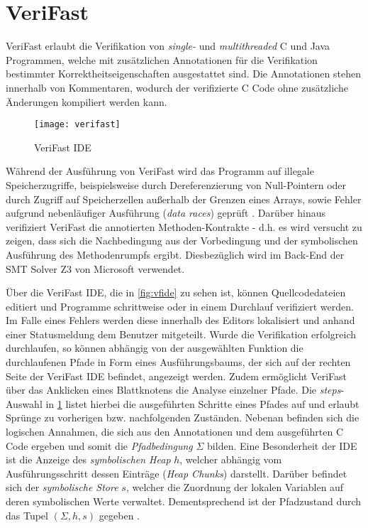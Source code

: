 \section{VeriFast}

VeriFast erlaubt die Verifikation von \emph{single-} und \emph{multithreaded} C und Java Programmen, welche mit zusätzlichen Annotationen für die Verifikation bestimmter Korrektheitseigenschaften ausgestattet sind. Die Annotationen stehen innerhalb von Kommentaren, wodurch der verifizierte C Code ohne zusätzliche Änderungen kompiliert werden kann.

\begin{figure}[t]
	\centering
	\texttt{[image: verifast]}
	\caption{VeriFast IDE}
	\label{fig:vfide}
\end{figure}

Während der Ausführung von VeriFast wird das Programm auf illegale Speicherzugriffe, beispielsweise durch Dereferenzierung von Null-Pointern oder durch Zugriff auf Speicherzellen außerhalb der Grenzen eines Arrays, sowie Fehler aufgrund nebenläufiger Ausführung (\emph{data races}) geprüft \cite{Jacobs2010}. Darüber hinaus verifiziert VeriFast die annotierten Methoden-Kontrakte - d.h. es wird versucht zu zeigen, dass sich die Nachbedingung aus der Vorbedingung und der symbolischen Ausführung des Methodenrumpfs ergibt. Diesbezüglich wird im Back-End der SMT Solver Z3 von Microsoft verwendet.

Über die VeriFast IDE, die in \vref{fig:vfide} zu sehen ist, können Quellcodedateien editiert und Programme schrittweise oder in einem Durchlauf verifiziert werden. Im Falle eines Fehlers werden diese innerhalb des Editors lokalisiert und anhand einer Statusmeldung dem Benutzer mitgeteilt. Wurde die Verifikation erfolgreich durchlaufen, so können abhängig von der ausgewählten Funktion die durchlaufenen Pfade in Form eines Ausführungsbaums, der sich auf der rechten Seite der VeriFast IDE befindet, angezeigt werden. Zudem ermöglicht VeriFast über das Anklicken eines Blattknotens die Analyse einzelner Pfade. Die \emph{steps}-Auswahl in \cref{fig:vfide} listet hierbei die ausgeführten Schritte eines Pfades auf und erlaubt Sprünge zu vorherigen bzw. nachfolgenden Zuständen. Nebenan befinden sich die logischen Annahmen, die sich aus den Annotationen und dem ausgeführten C Code ergeben und somit die \emph{Pfadbedingung} $\Sigma$ bilden. Eine Besonderheit der IDE ist die Anzeige des \emph{symbolischen Heap} $h$, welcher abhängig vom Ausführungsschritt dessen Einträge (\emph{Heap Chunks}) darstellt. Darüber befindet sich der \emph{symbolische Store} $s$, welcher die Zuordnung der lokalen Variablen auf deren symbolischen Werte verwaltet. Dementsprechend ist der Pfadzustand durch das Tupel $(\Sigma, h, s)$ gegeben \cite{Jacobs2011}.

